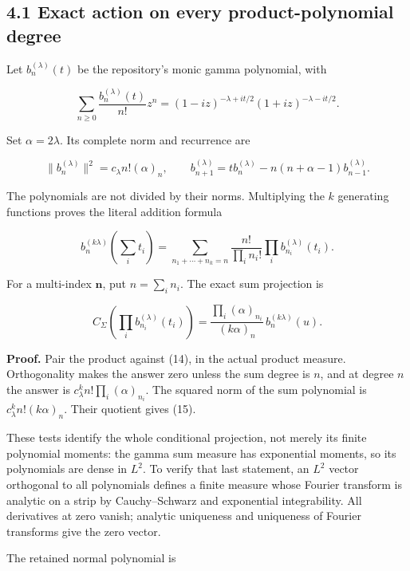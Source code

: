 \documentclass[
  11pt,
]{article}
\begin{document}
\subsection{4.1 Exact action on every product-polynomial
degree}\label{exact-action-on-every-product-polynomial-degree}

Let \(b_n^{(\lambda)}(t)\) be the repository's monic gamma polynomial,
with

\[
\sum_{n\ge0}\frac{b_n^{(\lambda)}(t)}{n!}z^n
=(1-iz)^{-\lambda+it/2}(1+iz)^{-\lambda-it/2}.
\]

Set \(\alpha=2\lambda\). Its complete norm and recurrence are

\[
\|b_n^{(\lambda)}\|^2=c_\lambda n!(\alpha)_n,\qquad
b_{n+1}^{(\lambda)}=t b_n^{(\lambda)}-n(n+\alpha-1)b_{n-1}^{(\lambda)}.
                                                                    \tag{13}
\]

The polynomials are not divided by their norms. Multiplying the \(k\)
generating functions proves the literal addition formula

\[
b_n^{(k\lambda)}(\sum_i t_i)
=\sum_{n_1+\cdots+n_k=n}\frac{n!}{\prod_i n_i!}
                         \prod_i b_{n_i}^{(\lambda)}(t_i).         \tag{14}
\]

For a multi-index \(\mathbf n\), put \(n=\sum_i n_i\). The exact sum
projection is

\[
\boxed{
C_\Sigma\left(\prod_i b_{n_i}^{(\lambda)}(t_i)\right)
 =\frac{\prod_i(\alpha)_{n_i}}{(k\alpha)_n}\,b_n^{(k\lambda)}(u).
}                                                                   \tag{15}
\]

\textbf{Proof.} Pair the product against (14), in the actual product
measure. Orthogonality makes the answer zero unless the sum degree is
\(n\), and at degree \(n\) the answer is
\(c_\lambda^k n!\prod_i(\alpha)_{n_i}\). The squared norm of the sum
polynomial is \(c_\lambda^k n!(k\alpha)_n\). Their quotient gives (15).

These tests identify the whole conditional projection, not merely its
finite polynomial moments: the gamma sum measure has exponential
moments, so its polynomials are dense in \(L^2\). To verify that last
statement, an \(L^2\) vector orthogonal to all polynomials defines a
finite measure whose Fourier transform is analytic on a strip by
Cauchy--Schwarz and exponential integrability. All derivatives at zero
vanish; analytic uniqueness and uniqueness of Fourier transforms give
the zero vector.

The retained normal polynomial is
\end{document}
